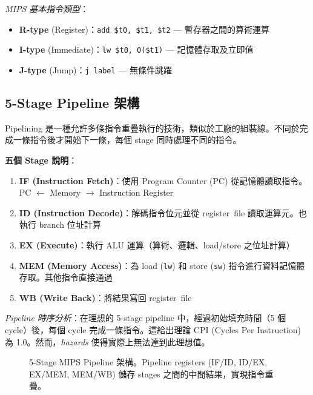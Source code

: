 \documentclass[journal]{IEEEtran}
\begin{document}
\textit{MIPS 基本指令類型}：
\begin{itemize}
    \item \textbf{R-type} (Register)：\texttt{add \$t0, \$t1, \$t2} --- 暫存器之間的算術運算
    \item \textbf{I-type} (Immediate)：\texttt{lw \$t0, 0(\$t1)} --- 記憶體存取及立即值
    \item \textbf{J-type} (Jump)：\texttt{j label} --- 無條件跳躍
\end{itemize}

\subsection{5-Stage Pipeline 架構}
Pipelining 是一種允許多條指令重疊執行的技術，類似於工廠的組裝線。不同於完成一條指令後才開始下一條，每個 stage 同時處理不同的指令。

\textbf{五個 Stage 說明}：
\begin{enumerate}
    \item \textbf{IF (Instruction Fetch)}：使用 Program Counter (PC) 從記憶體讀取指令。PC $\leftarrow$ Memory $\rightarrow$ Instruction Register
    \item \textbf{ID (Instruction Decode)}：解碼指令位元並從 register~file 讀取運算元。也執行 branch 位址計算
    \item \textbf{EX (Execute)}：執行 ALU 運算（算術、邏輯、load/store 之位址計算）
    \item \textbf{MEM (Memory Access)}：為 load (\texttt{lw}) 和 store (\texttt{sw}) 指令進行資料記憶體存取。其他指令直接通過
    \item \textbf{WB (Write Back)}：將結果寫回 register~file
\end{enumerate}

\textit{Pipeline 時序分析}：在理想的 5-stage pipeline 中，經過初始填充時間（5 個 cycle）後，每個 cycle 完成一條指令。這給出理論 CPI (Cycles Per Instruction) 為 1.0。然而，\textit{hazards} 使得實際上無法達到此理想值。

\begin{figure}[!t]
\centering
{}
\caption{5-Stage MIPS Pipeline 架構。Pipeline registers (IF/ID, ID/EX, EX/MEM, MEM/WB) 儲存 stages 之間的中間結果，實現指令重疊。}
\label{fig:pipeline}
\end{figure}
\end{document}
